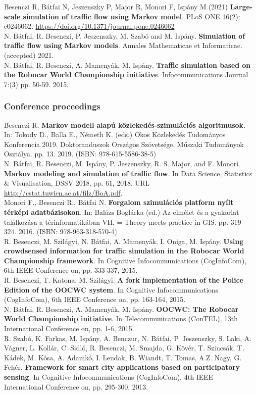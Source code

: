 \documentclass[b5paper,12pt]{report}
\theoremstyle{definition}
\begin{document}
\begin{singlespace}
\small
\noindent
Besenczi R, Bátfai N, Jeszenszky P, Major R, Monori F, Ispány M (2021) {\bf{Large-scale simulation of traffic flow using Markov model}}. PLoS ONE 16(2): e0246062. \url{https://doi.org/10.1371/journal.pone.0246062}
\\[10pt]
\noindent
N. Bátfai, R. Besenczi, P. Jeszenszky, M. Szabó and M. Ispány. {\bf{Simulation of traffic flow using Markov models}}. Annales Mathematicae et Informaticae. (accepted) 2021.
\\[10pt]
\noindent
N. Bátfai, R. Besenczi, A. Mamenyák, M. Ispány. {\bf{Traffic simulation based on the Robocar World Championship initiative}}. Infocommunications Journal 7:(3) pp. 50-59. 2015.

\subsubsection*{Conference proceedings}

\noindent
Besenczi R. {\bf{Markov modell alapú közlekedés-szimulációs algoritmusok}}. In: Tokody D., Balla E., Németh K. (eds.) Okos Közlekedés Tudományos Konferencia 2019. Doktoranduszok Országos Szövetsége, Műszaki Tudományok Osztálya. pp. 13. 2019. (ISBN: 978-615-5586-38-5)
\\[10pt]
\noindent
N. Bátfai, R. Besenczi, M. Ispány, P. Jeszenszky, R. S. Major, and F. Monori. {\bf{Markov modeling and simulation of traffic flow}}. In Data Science, Statistics \& Visualisation, DSSV 2018, pp. 61, 2018. URL \url{http://cstat.tuwien.ac.at/filz/BoA.pdf}.
\\[10pt]
\noindent
Monori F., Besenczi R., Bátfai N. {\bf{Forgalom szimulációs platform nyílt térképi adatbázisokon}}. In: Balázs Boglárka (ed.) Az elmélet és a gyakorlat találkozása a térinformatikában VII. = Theory meets practice in GIS. pp. 319-324. 2016. (ISBN: 978-963-318-570-4)
\\[10pt]
\noindent
R. Besenczi, M. Szilágyi, N. Bátfai, A. Mamenyák, I. Oniga, M. Ispány. {\bf{Using crowdsensed information for traffic simulation in the Robocar World Championship framework}}. In Cognitive Infocommunications (CogInfoCom), 6th IEEE Conference on, pp. 333-337, 2015.
\\[10pt]
\noindent
R. Besenczi, T. Katona, M. Szilágyi. {\bf{A fork implementation of the Police Edition of the OOCWC system}}. In Cognitive Infocommunications (CogInfoCom), 6th IEEE Conference on, pp. 163-164, 2015.
\\[10pt]
\noindent
N. Bátfai, R. Besenczi, A. Mamenyák, M. Ispány. {\bf{OOCWC: The Robocar World Championship initiative}}. In Telecommunications (ConTEL), 13th International Conference on, pp. 1-6, 2015.
\\[10pt]
\noindent
R. Szabó, K. Farkas, M. Ispány, A. Benczur, N. Bátfai, P. Jeszenszky, S. Laki, A. Vágner, L. Kollár, C. Sidló, R. Besenczi, M. Smajda, G. Kövér, T. Szincsák, T. Kádek, M. Kósa, A. Adamkó, I. Lendak, B. Wiandt, T. Tomas, A.Z. Nagy, G. Fehér. {\bf{Framework for smart city applications based on participatory sensing}}. In Cognitive Infocommunications (CogInfoCom), 4th IEEE International Conference on, pp. 295-300, 2013.


\end{singlespace}
\end{document}

